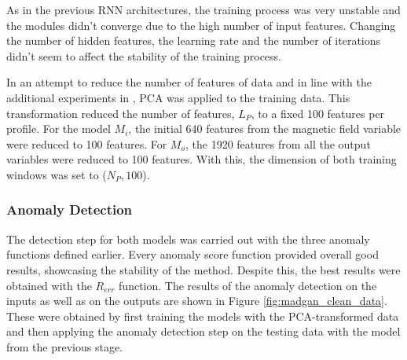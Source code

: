 As in the previous RNN architectures, the training process was very unstable and the modules didn't converge due to the high number of input features. Changing the number of hidden features, the learning rate and the number of iterations didn't seem to affect the stability of the training process.

In an attempt to reduce the number of features of data and in line with the additional experiments in \cite{li.etal_MADGANMultivariateAnomaly_2019}, PCA was applied to the training data. This transformation reduced the number of features, $L_P$, to a fixed 100 features per profile. For the model $M_i$, the initial 640 features from the magnetic field variable were reduced to 100 features. For $M_o$, the 1920 features from all the output variables were reduced to 100 features. With this, the dimension of both training windows was set to ($N_P, 100$).

\subsubsection*{Anomaly Detection}
The detection step for both models was carried out with the three anomaly functions defined earlier. Every anomaly score function provided overall good results, showcasing the stability of the method. Despite this, the best results were obtained with the $R_{err}$ function. The results of the anomaly detection on the inputs as well as on the outputs are shown in Figure \ref{fig:madgan_clean_data}. These were obtained by first training the models with the PCA-transformed data and then applying the anomaly detection step on the testing data with the model from the previous stage.

